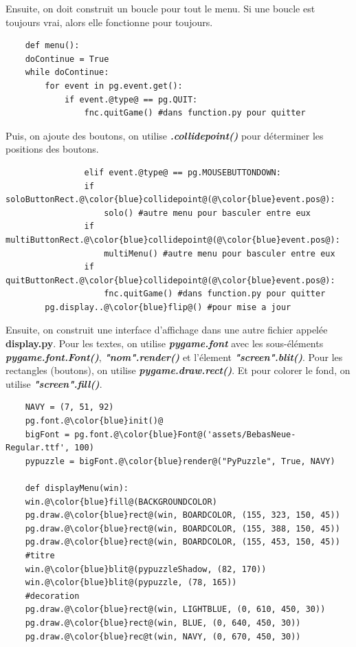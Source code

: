 \documentclass[a4paper]{report}
\begin{document}
Ensuite, on doit construit un boucle pour tout le menu. Si une boucle est toujours vrai, alors elle fonctionne pour toujours.
\begin{lstlisting}
    def menu():
    doContinue = True
    while doContinue:
        for event in pg.event.get():
            if event.@type@ == pg.QUIT:
                fnc.quitGame() #dans function.py pour quitter
\end{lstlisting}

Puis, on ajoute des boutons, on utilise \textbf{\textit{.collidepoint()}} pour déterminer les positions des boutons.
\begin{lstlisting}
                elif event.@type@ == pg.MOUSEBUTTONDOWN:
                if soloButtonRect.@\color{blue}collidepoint@(@\color{blue}event.pos@):
                    solo() #autre menu pour basculer entre eux
                if multiButtonRect.@\color{blue}collidepoint@(@\color{blue}event.pos@):
                    multiMenu() #autre menu pour basculer entre eux
                if quitButtonRect.@\color{blue}collidepoint@(@\color{blue}event.pos@):
                    fnc.quitGame() #dans function.py pour quitter
        pg.display..@\color{blue}flip@() #pour mise a jour
\end{lstlisting}

Ensuite, on construit une interface d'affichage dans une autre fichier appelée \textbf{display.py}. 
Pour les textes, on utilise \textbf{\textit{pygame.font}} avec les sous-éléments \textbf{\textit{pygame.font.Font()}}, \textbf{\textit{"nom".render()}} et l'élement \textbf{\textit{"screen".blit()}}. 
Pour les rectangles (boutons), on utilise \textbf{\textit{pygame.draw.rect()}}.
Et pour colorer le fond, on utilise \textbf{\textit{"screen".fill()}}.

\begin{lstlisting}
    NAVY = (7, 51, 92)
    pg.font.@\color{blue}init()@
    bigFont = pg.font.@\color{blue}Font@('assets/BebasNeue-Regular.ttf', 100)
    pypuzzle = bigFont.@\color{blue}render@("PyPuzzle", True, NAVY)

    def displayMenu(win):
    win.@\color{blue}fill@(BACKGROUNDCOLOR)
    pg.draw.@\color{blue}rect@(win, BOARDCOLOR, (155, 323, 150, 45))
    pg.draw.@\color{blue}rect@(win, BOARDCOLOR, (155, 388, 150, 45))
    pg.draw.@\color{blue}rect@(win, BOARDCOLOR, (155, 453, 150, 45))
    #titre
    win.@\color{blue}blit@(pypuzzleShadow, (82, 170))
    win.@\color{blue}blit@(pypuzzle, (78, 165))
    #decoration
    pg.draw.@\color{blue}rect@(win, LIGHTBLUE, (0, 610, 450, 30))
    pg.draw.@\color{blue}rect@(win, BLUE, (0, 640, 450, 30))
    pg.draw.@\color{blue}rec@t(win, NAVY, (0, 670, 450, 30))
\end{lstlisting}
\end{document}

